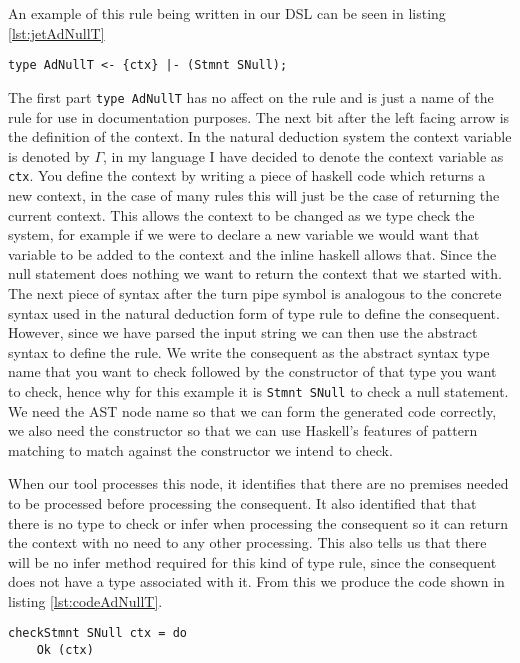 An example of this rule being written in our DSL can be seen in listing \ref{lst:jetAdNullT}
\begin{lstlisting}[caption = Jet type rule for null statement, label=lst:jetAdNullT]
type AdNullT <- {ctx} |- (Stmnt SNull);
\end{lstlisting} 

The first part \texttt{type AdNullT} has no affect on the rule and is just a name of the rule for use in documentation purposes.
The next bit after the left facing arrow is the definition of the context.
In the natural deduction system the context variable is denoted by $\Gamma$, in my language I have decided to denote the context variable as \texttt{ctx}.
You define the context by writing a piece of haskell code which returns a new context, in the case of many rules this will just be the case of returning the current context.
This allows the context to be changed as we type check the system, for example if we were to declare a new variable we would want that variable to be added to the context and the inline haskell allows that.
Since the null statement does nothing we want to return the context that we started with.
The next piece of syntax after the turn pipe symbol is analogous to the concrete syntax used in the natural deduction form of type rule to define the consequent.
However, since we have parsed the input string we can then use the abstract syntax to define the rule.
We write the consequent as the abstract syntax type name that you want to check followed by the constructor of that type you want to check, hence why for this example it is \texttt{Stmnt SNull} to check a null statement.
We need the AST node name so that we can form the generated code correctly, we also need the constructor so that we can use Haskell's features of pattern matching to match against the constructor we intend to check.

When our tool processes this node, it identifies that there are no premises needed to be processed before processing the consequent.
It also identified that that there is no type to check or infer when processing the consequent so it can return the context with no need to any other processing.
This also tells us that there will be no infer method required for this kind of type rule, since the consequent does not have a type associated with it.
From this we produce the code shown in listing \ref{lst:codeAdNullT}.
\begin{lstlisting}[caption = Code generated from rule AdNullT, label=lst:codeAdNullT]
checkStmnt SNull ctx = do
    Ok (ctx)
\end{lstlisting}

